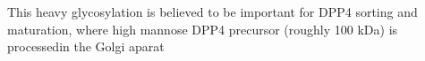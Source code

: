 This heavy glycosylation is believed to be important for DPP4 sorting and maturation, where high mannose DPP4 precursor (roughly 100 kDa) is processedin the Golgi aparat \cite{Matter_1991}